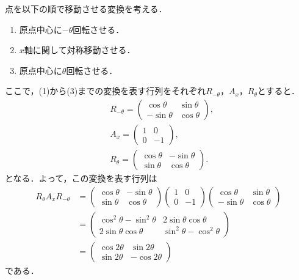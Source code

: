 \documentclass[a4paper,10pt,fleqn]{ltjsarticle}
\begin{document}
\begin{tleftbar}
  点を以下の順で移動させる変換を考える．
  \begin{enumerate}
    \item 原点中心に$-\theta$回転させる．
    \item $x$軸に関して対称移動させる．
    \item 原点中心に$\theta$回転させる．
  \end{enumerate}
  ここで，(1)から(3)までの変換を表す行列をそれぞれ$R_{-\theta}$，$A_{x}$，$R_{\theta}$とすると．
  \begin{align*}
     & R_{-\theta} = \begin{pmatrix} \cos \theta & \sin \theta \\ -\sin \theta & \cos \theta \end{pmatrix} , \\
     & A_{x} = \begin{pmatrix} 1 & 0 \\ 0 & -1 \end{pmatrix} ,                                               \\
     & R_{\theta} = \begin{pmatrix} \cos \theta & -\sin \theta \\ \sin \theta & \cos \theta \end{pmatrix} .
  \end{align*}
  となる．よって，この変換を表す行列は
  \begin{align*}
    R_{\theta} A_x R_{-\theta} & =\begin{pmatrix} \cos \theta & -\sin \theta \\ \sin \theta & \cos \theta \end{pmatrix}
    \begin{pmatrix} 1 & 0 \\ 0 & -1 \end{pmatrix}
    \begin{pmatrix} \cos \theta & \sin \theta \\ -\sin \theta & \cos \theta \end{pmatrix}                                                                                                \\
                               & = \begin{pmatrix} \cos ^2 \theta - \sin ^2 \theta & 2\sin \theta \cos \theta \\ 2\sin \theta \cos \theta & \sin ^2 \theta -\cos ^2 \theta \end{pmatrix} \\
                               & = \begin{pmatrix} \cos 2 \theta & \sin 2 \theta \\ \sin 2\theta & -\cos 2 \theta \end{pmatrix}
  \end{align*}
  である．
\end{tleftbar}
\end{document}

